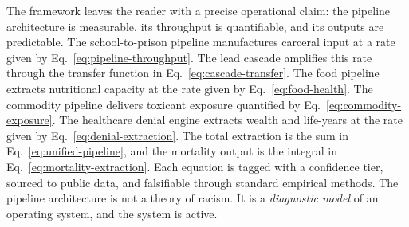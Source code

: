 The framework leaves the reader with a precise operational claim: the pipeline architecture is measurable, its throughput is quantifiable, and its outputs are predictable. The school-to-prison pipeline manufactures carceral input at a rate given by Eq.~\ref{eq:pipeline-throughput}. The lead cascade amplifies this rate through the transfer function in Eq.~\ref{eq:cascade-transfer}. The food pipeline extracts nutritional capacity at the rate given by Eq.~\ref{eq:food-health}. The commodity pipeline delivers toxicant exposure quantified by Eq.~\ref{eq:commodity-exposure}. The healthcare denial engine extracts wealth and life-years at the rate given by Eq.~\ref{eq:denial-extraction}. The total extraction is the sum in Eq.~\ref{eq:unified-pipeline}, and the mortality output is the integral in Eq.~\ref{eq:mortality-extraction}. Each equation is tagged with a confidence tier, sourced to public data, and falsifiable through standard empirical methods. The pipeline architecture is not a theory of racism. It is a \textit{diagnostic model} of an operating system, and the system is active.
